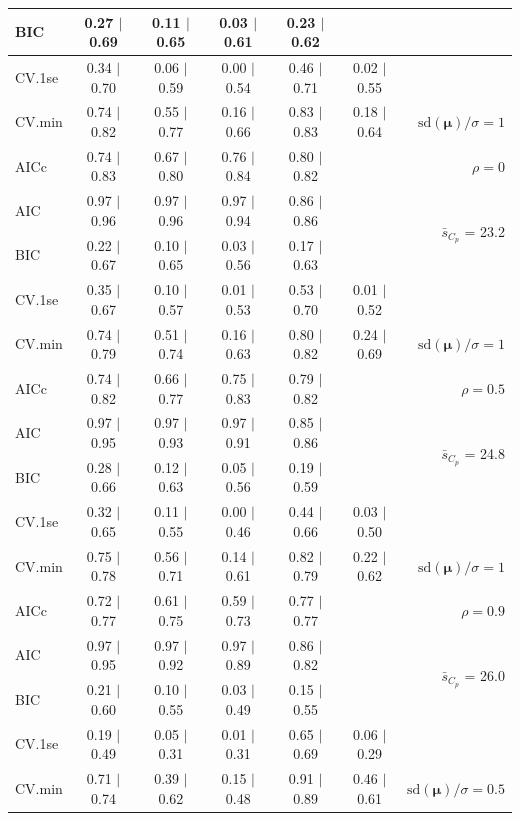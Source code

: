 \documentclass[12pt]{article}
\newcommand{\mr}[1]{\mathrm{#1}}
\newcommand{\bm}[1]{\mathbf{#1}}
\begin{document}
\begin{table}[p]
\begin{center}
\begin{tabular}{l*{5}{c}|r}
BIC & 0.27 $\mid$ 0.69 & 0.11 $\mid$ 0.65 & 0.03 $\mid$ 0.61 & 0.23 $\mid$ 0.62 & & \\
 \hline 
CV.1se & 0.34 $\mid$ 0.70 & 0.06 $\mid$ 0.59 & 0.00 $\mid$ 0.54 & 0.46 $\mid$ 0.71 & 0.02 $\mid$ 0.55 &\\
CV.min & 0.74 $\mid$ 0.82 & 0.55 $\mid$ 0.77 & 0.16 $\mid$ 0.66 & 0.83 $\mid$ 0.83 & 0.18 $\mid$ 0.64 &  $\mr{sd}(\bm{\mu})/\sigma=1$ \\
AICc & 0.74 $\mid$ 0.83 & 0.67 $\mid$ 0.80 & 0.76 $\mid$ 0.84 & 0.80 $\mid$ 0.82 & & $\rho=0$ \\
AIC & 0.97 $\mid$ 0.96 & 0.97 $\mid$ 0.96 & 0.97 $\mid$ 0.94 & 0.86 $\mid$ 0.86 & & \multirow{2}{*}{$\bar{s}_{C_p}$ = 23.2} \\
BIC & 0.22 $\mid$ 0.67 & 0.10 $\mid$ 0.65 & 0.03 $\mid$ 0.56 & 0.17 $\mid$ 0.63 & & \\
 \hline 
CV.1se & 0.35 $\mid$ 0.67 & 0.10 $\mid$ 0.57 & 0.01 $\mid$ 0.53 & 0.53 $\mid$ 0.70 & 0.01 $\mid$ 0.52 &\\
CV.min & 0.74 $\mid$ 0.79 & 0.51 $\mid$ 0.74 & 0.16 $\mid$ 0.63 & 0.80 $\mid$ 0.82 & 0.24 $\mid$ 0.69 &  $\mr{sd}(\bm{\mu})/\sigma=1$ \\
AICc & 0.74 $\mid$ 0.82 & 0.66 $\mid$ 0.77 & 0.75 $\mid$ 0.83 & 0.79 $\mid$ 0.82 & & $\rho=0.5$ \\
AIC & 0.97 $\mid$ 0.95 & 0.97 $\mid$ 0.93 & 0.97 $\mid$ 0.91 & 0.85 $\mid$ 0.86 & & \multirow{2}{*}{$\bar{s}_{C_p}$ = 24.8} \\
BIC & 0.28 $\mid$ 0.66 & 0.12 $\mid$ 0.63 & 0.05 $\mid$ 0.56 & 0.19 $\mid$ 0.59 & & \\
 \hline 
CV.1se & 0.32 $\mid$ 0.65 & 0.11 $\mid$ 0.55 & 0.00 $\mid$ 0.46 & 0.44 $\mid$ 0.66 & 0.03 $\mid$ 0.50 &\\
CV.min & 0.75 $\mid$ 0.78 & 0.56 $\mid$ 0.71 & 0.14 $\mid$ 0.61 & 0.82 $\mid$ 0.79 & 0.22 $\mid$ 0.62 &  $\mr{sd}(\bm{\mu})/\sigma=1$ \\
AICc & 0.72 $\mid$ 0.77 & 0.61 $\mid$ 0.75 & 0.59 $\mid$ 0.73 & 0.77 $\mid$ 0.77 & & $\rho=0.9$ \\
AIC & 0.97 $\mid$ 0.95 & 0.97 $\mid$ 0.92 & 0.97 $\mid$ 0.89 & 0.86 $\mid$ 0.82 & & \multirow{2}{*}{$\bar{s}_{C_p}$ = 26.0} \\
BIC & 0.21 $\mid$ 0.60 & 0.10 $\mid$ 0.55 & 0.03 $\mid$ 0.49 & 0.15 $\mid$ 0.55 & & \\
 \hline 
CV.1se & 0.19 $\mid$ 0.49 & 0.05 $\mid$ 0.31 & 0.01 $\mid$ 0.31 & 0.65 $\mid$ 0.69 & 0.06 $\mid$ 0.29 &\\
CV.min & 0.71 $\mid$ 0.74 & 0.39 $\mid$ 0.62 & 0.15 $\mid$ 0.48 & 0.91 $\mid$ 0.89 & 0.46 $\mid$ 0.61 &  $\mr{sd}(\bm{\mu})/\sigma=0.5$ \\

\end{tabular}
\end{center}
\end{table}
\end{document}
